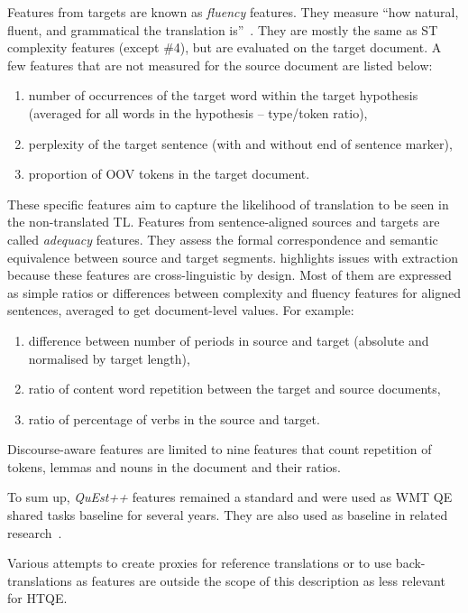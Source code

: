 Features from targets are known as \textit{fluency} features. They measure ``how natural, fluent, and grammatical the translation is''~\cite[p.53]{Specia2018a}. They are mostly the same as ST complexity features (except \#4), but are evaluated on the target document. A few features that are not measured for the source document are listed below:
\begin{enumerate}\compresslist{}
	\item number of occurrences of the target word within the target hypothesis (averaged for all words in the hypothesis -- type/token ratio),
	\item perplexity of the target sentence (with and without end of sentence marker),
	\item proportion of \gls{OOV} tokens in the target document.
\end{enumerate}
These specific features aim to capture the likelihood of translation to be seen in the non-translated TL.
\label{pg:quest_adequacy_feats}
Features from sentence-aligned sources and targets are called \textit{adequacy} features. They assess the formal correspondence and semantic equivalence between source and target segments. \citet{Specia2018a} highlights issues with extraction because these features are cross-linguistic by design. Most of them are expressed as simple ratios or differences between complexity and fluency features for aligned sentences, averaged to get document-level values. For example:

\begin{enumerate}\compresslist{}
	\item difference between number of periods in source and target (absolute and normalised by target length),
	\item ratio of content word repetition between the target and source documents,
	\item ratio of percentage of verbs in the source and target.
\end{enumerate}

Discourse-aware features are limited to nine features that count repetition of tokens, lemmas and nouns in the document and their ratios. 

To sum up, \textit{QuEst++} features remained a standard and were used as WMT QE shared tasks baseline for several years. They are also used as baseline in related research~\cite[e.g.][including for HTQE in~\citet{Yuan2016} and subsequent publications]{Kozlova2016}.

Various attempts to create proxies for reference translations or to use back-translations as features are outside the scope of this description as less relevant for HTQE. 

